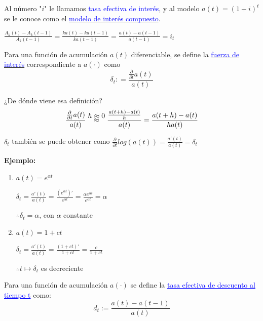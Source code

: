 Al número "$i$"  le llamamos \textcolor{blue}{tasa efectiva de interés}, y al modelo $a(t)=(1+i)^t$ se le conoce como el \underline{\textcolor{blue}{modelo de interés compuesto}}.

\begin{remark}
$\frac{A_k(t)-A_k(t-1)}{A_k(t-1)}=\frac{ka(t) - ka(t-1)}{ka(t-1)} = \frac{a(t)-a(t-1)}{a(t-1)} = i_t$
\end{remark}

\begin{definition}
Para una función de acumulación $a(t)$ diferenciable, se define la \underline{\textcolor{blue}{fuerza de interés}} correspondiente a $a(\cdot)$ como 
\begin{equation*}
\boxed{
\delta_t : = \frac{\frac{\partial}{\partial t} a(t)}{a(t)}
}
\end{equation*}

¿De dónde viene esa definición?
$$\frac{\frac{\partial}
{\partial t} a(t)}{a(t)} \mathrel{\stackon[1pt]{$\approx$}{$h \approx 0$}} \frac{\frac{a(t+h)-a(t)}{h}}{a(t)} = \frac{a(t+h)- a(t)}{ha(t)}$$


\end{definition}

\begin{remark}
$\delta_t$ también se puede obtener como $\frac{\partial}{\partial t} log(a(t)) = \frac{a'(t)}{a(t)} = \delta_t$
\end{remark}

\textbf{Ejemplo: }
\begin{enumerate}
\item $a(t)=e^{\alpha t}$

$\delta_t = \frac{a'(t)}{a(t)} = \frac{\left( e^{\alpha t}\right)'}{e^{\alpha t}} = \frac{\alpha e^{\alpha t}}{e^{\alpha t}} = \alpha$         

$\therefore \delta_t = \alpha$, con $\alpha$ constante
\item $a(t) = 1+ct$

$\delta_t = \frac{a'(t)}{a(t)} = \frac{\left( 1+ct\right)'}{1+ct} = \frac{c}{1+ct}$ 

$\therefore t\longmapsto \delta_t$ es decreciente
\end{enumerate}

\begin{definition}
Para una función de acumulación $a(\cdot )$ se define la \textcolor{blue}{\underline{tasa efectiva de descuento al tiempo t}} como:
\begin{equation*}
\boxed{d_t := \frac{a(t)-a(t-1)}{a(t)}}
\end{equation*} 
\end{definition}


